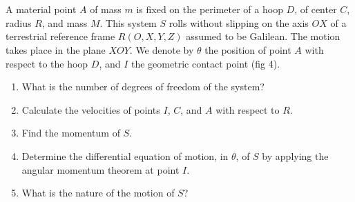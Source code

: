 \documentclass[12pt]{article}
\begin{document}
\section{}

A material point $A$ of mass $m$ is fixed on the perimeter of a hoop $D$, of center $C$, radius $R$, and mass $M$. This system $S$ rolls without slipping on the axis $OX$ of a terrestrial reference frame $R(O, X, Y, Z)$ assumed to be Galilean. The motion takes place in the plane $XOY$. We denote by $\theta$ the position of point $A$ with respect to the hoop $D$, and $I$ the geometric contact point (fig 4).

\begin{enumerate}
    \item What is the number of degrees of freedom of the system?
    \item Calculate the velocities of points $I$, $C$, and $A$ with respect to $R$.
    \item Find the momentum of $S$.
    \item Determine the differential equation of motion, in $\theta$, of $S$ by applying the angular momentum theorem at point $I$.
    \item What is the nature of the motion of $S$?
\end{enumerate}
\end{document}
